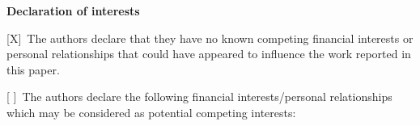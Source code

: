 \documentclass[11pt]{article}
\newcommand{\checkedbox}{[X]}
\newcommand{\uncheckedbox}{[ ]}
\begin{document}
{\Large\bfseries Declaration of interests}

\checkedbox\ The authors declare that they have no known competing financial
interests or personal relationships that could have appeared to influence the
work reported in this paper.

\uncheckedbox\ The authors declare the following financial interests/personal
relationships which may be considered as potential competing interests:

\vspace{4\baselineskip}

\hrulefill
\end{document}

